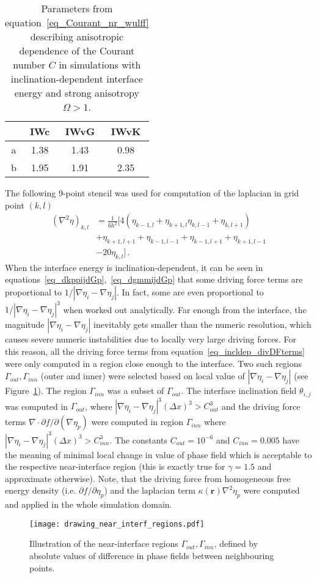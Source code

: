 \begin{table}[]
	\centering
	\caption{Parameters from equation~\eqref{eq_Courant_nr_wulff} describing anisotropic dependence of the Courant number $C$ in simulations with inclination-dependent interface energy and strong anisotropy $\Omega>1$.}
	\label{tab_Courant_nr_wulff}
	\begin{tabular}{c|c|c|c}
		& IWc & IWvG & IWvK \\ \hline
		a & 1.38 & 1.43 & 0.98\\
		b& 1.95 & 1.91 & 2.35
	\end{tabular}
\end{table}
The following 9-point stencil was used for computation of the laplacian in grid point $(k,l)$
\begin{equation}
	\begin{split}
		(\nabla^2\eta)_{k,l} &=  \frac{1}{6h^2}[4(\eta_{k-1,l}+ \eta_{k+1,l} \eta_{k,l-1}+ \eta_{k,l+1}) \\
		&+ \eta_{k+1,l+1} +\eta_{k-1,l-1}+\eta_{k-1,l+1}+\eta_{k+1,l-1} \\
		&-20\eta_{k,l}]  \,.
	\end{split}
\end{equation}
When the interface energy is inclination-dependent, it can be seen in equations~\eqref{eq_dkppijdGp},~\eqref{eq_dgmmijdGp} that some driving force terms are proportional to $1/|\nabla\eta_i-\nabla\eta_j|$. In fact, some are even proportional to $1/|\nabla\eta_i-\nabla\eta_j|^3$ when worked out analytically. Far enough from the interface, the magnitude $|\nabla\eta_i-\nabla\eta_j|$ inevitably gets smaller than the numeric resolution, which causes severe numeric instabilities due to locally very large driving forces. For this reason, all the driving force terms from equation~\eqref{eq_incldep_divDFterms} were only computed in a region close enough to the interface. Two such regions $\Gamma_{out},\Gamma_{inn}$ (outer and inner) were selected based on local value of $|\nabla\eta_i-\nabla\eta_j|$ (see Figure~\ref{fig_sketch_near_interf_regions}). The region $\Gamma_{inn}$ was a subset of $\Gamma_{out}$. The interface inclination field $\theta_{i,j}$ was computed in $\Gamma_{out}$, where $|\nabla\eta_i-\nabla\eta_j|^3(\Delta x)^3>C_{out}^3$ and the driving force terms $\nabla\cdot\partial f/\partial(\nabla\eta_p)$ were computed in region $\Gamma_{inn}$ where $|\nabla\eta_i-\nabla\eta_j|^3(\Delta x)^3>C_{inn}^3$. The constants $C_{out}=10^{-6}$ and $C_{inn}=0.005$ have the meaning of minimal local change in value of phase field which is acceptable to the respective near-interface region (this is exactly true for $\gamma=1.5$ and approximate otherwise). Note, that the driving force from homogeneous free energy density (i.e. $\partial f/\partial \eta_p$) and the laplacian term $\kappa(\bm{r})\nabla^2\eta_p$ were computed and applied in the whole simulation domain.
\begin{figure}[]
	\centering
	\texttt{[image: drawing\_near\_interf\_regions.pdf]}
	\caption{Illustration of the near-interface regions $\Gamma_{out},\Gamma_{inn}$, defined by absolute values of difference in phase fields between neighbouring points.}
	\label{fig_sketch_near_interf_regions}
\end{figure}

